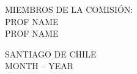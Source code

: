 \documentclass[letterpaper, 12pt]{scrreprt}
\begin{document}
\begin{titlepage}
\begin{center}
	\vspace{0.7 cm}

	\footnotesize{MIEMBROS DE LA COMISIÓN:} \\
	\vspace{0.08 cm}
	\normalsize{PROF NAME} \\
	\normalsize{PROF NAME}
	
	\vspace*{2.0 cm}
  \footnotesize{SANTIAGO DE CHILE} \\
  \footnotesize{MONTH -- YEAR}
\end{center}

\end{titlepage}
\end{document}
